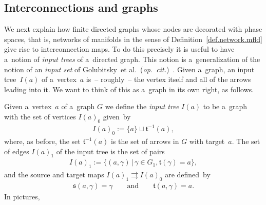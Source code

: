 \documentclass[10pt,a4paper]{amsart}
\numberwithin{equation}{section}
\begin{document}
\subsection{Interconnections and graphs}

We next explain how f\/inite directed graphs whose nodes are decorated with phase spaces, that is, networks of manifolds
in the sense of Def\/inition~\ref{def.network.mfld} give rise to interconnection maps.
To do this precisely it is useful to have a~notion of {\em input trees} of a~directed graph.
This notion is a~generalization of the notion of an {\em input set} of Golubitsky~et al.\ ({\em op.\ cit.})~\cite{Golubitsky.Stewart.Torok.05,Stewart.Golubitsky.Pivato.03}.
Given a~graph, an input tree~$I(a)$ of a~vertex~$a$ is~-- roughly~-- the vertex itself and all of the arrows leading into it.
We want to think of this as a~graph in its own right, as follows.

\begin{Definition}\label{def:input-tree}
Given a~vertex~$a$ of a~graph $ G$ we def\/ine the {\em input tree} $I(a)$ to be a~graph with the set of vertices $I(a)_0$
given~by
\begin{gather*}
I(a)_0:= \{a\}\sqcup \mathfrak t^{-1} (a),
\end{gather*}
where, as before, the set $\mathfrak t^{-1} (a)$ is the set of arrows in $ G$ with target~$a$.
The set of edges $I(a)_1$ of the input tree is the set of pairs
\begin{gather*}
I(a)_1:= \{(a, \gamma)\,|\, \gamma \in G_1, \mathfrak t(\gamma) =a \},
\end{gather*}
and the source and target maps $I(a)_1\rightrightarrows I(a)_0$ are def\/ined~by
\begin{gather*}
\mathfrak s(a, \gamma) = \gamma
\qquad
\text{and}
\qquad
\mathfrak t(a, \gamma) = a.
\end{gather*}
In pictures,

\end{Definition}
\end{document}
